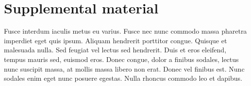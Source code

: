 \section{Supplemental material}\label{app:C}

\appindent Fusce interdum iaculis metus eu varius. Fusce nec nunc commodo massa pharetra imperdiet eget quis ipsum. Aliquam hendrerit porttitor congue. Quisque et malesuada nulla. Sed feugiat vel lectus sed hendrerit. Duis et eros eleifend, tempus mauris sed, euismod eros. Donec congue, dolor a finibus sodales, lectus nunc suscipit massa, at mollis massa libero non erat. Donec vel finibus est. Nunc sodales enim eget nunc posuere egestas. Nulla rhoncus commodo leo et dapibus.